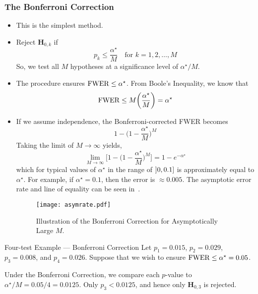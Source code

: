 \subsubsection*{The Bonferroni Correction}
\begin{itemize}
    \item This is the simplest method.
    \item Reject $ \mathbf{H}_{0,k} $ if
          \[ p_k\le \frac{\alpha^\star}{M} \quad\text{for }k=1,2,\ldots,M \]
          So, we test all $ M $ hypotheses at a significance level of $ \alpha^\star/M $.
    \item The procedure ensures $ \operatorname{FWER}\le \alpha^\star $. From Boole's Inequality,
          we know that
          \[ \operatorname{FWER}\le M\biggl(\frac{\alpha^\star}{M}\biggr)=\alpha^\star \]
    \item If we assume independence, the Bonferroni-corrected FWER becomes
          \[ 1-\biggl(1-\frac{\alpha^\star}{M} \biggr)^{\! M} \]
          Taking the limit of $ M \to\infty $ yields,
          \[ \lim\limits_{{M} \to {\infty}}\Biggl[1-\biggl(1-\frac{\alpha^\star}{M} \biggr)^{\! M}\Biggr]=1-e^{-\alpha^\star}  \]
          which for typical values of $ \alpha^\star $ in the range of $ \interval[open left]{0}{0.1} $ is approximately equal to $ \alpha^\star $.
          For example, if $ \alpha^\star=0.1 $, then the error is $ \approx 0.005 $. The asymptotic error rate
          and line of equality can be seen in~.
          \begin{figure}[!htbp]
              \centering
              \texttt{[image: asymrate.pdf]}
              \caption{Illustration of the Bonferroni Correction for Asymptotically Large $M$.}\label{fig:asymrate}
          \end{figure}
\end{itemize}
\begin{Example}{Four-test Example --- Bonferroni Correction}{}
    Let $ p_1=0.015 $, $ p_2=0.029 $, $ p_3=0.008 $, and $ p_4=0.026 $. Suppose that we wish to ensure
    $ \operatorname{FWER}\le \alpha^\star=0.05 $.

    \vspace{2mm}

    Under the Bonferroni Correction, we compare each
    $ p $-value to $ \alpha^\star/M=0.05/4=0.0125 $. Only $ p_3<0.0125 $, and hence
    only $ \mathbf{H}_{0,3} $ is rejected.
\end{Example}
